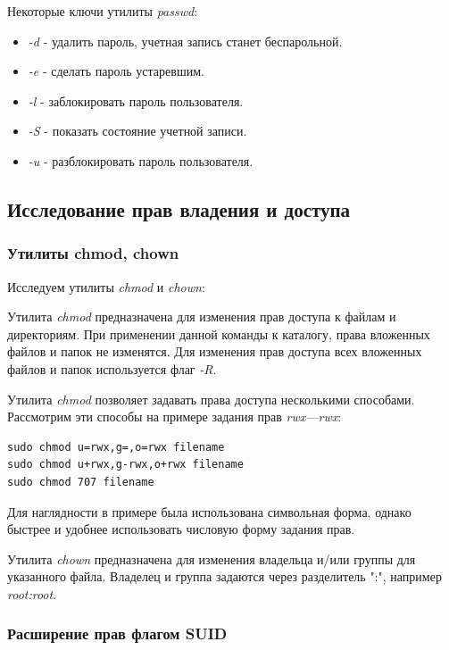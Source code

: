 \documentclass[14pt,a4paper,report]{report}
\begin{document}


Некоторые ключи утилиты \emph{passwd}:

\begin{itemize}
	\item \emph{-d} - удалить пароль, учетная запись станет беспарольной.
	\item \emph{-e} - сделать пароль устаревшим.
	\item \emph{-l} - заблокировать пароль пользователя.
	\item \emph{-S} - показать состояние учетной записи.
	\item \emph{-u} - разблокировать пароль пользователя.
\end{itemize}

\subsection{Исследование прав владения и доступа}

\subsubsection{Утилиты chmod, chown}

Исследуем утилиты \emph{chmod} и \emph{chown}:



Утилита \emph{chmod} предназначена для изменения прав доступа к файлам и директориям. При применении данной команды к каталогу, права вложенных файлов и папок не изменятся. Для изменения прав доступа всех вложенных файлов и папок используется флаг \emph{-R}. 

Утилита \emph{chmod} позволяет задавать права доступа несколькими способами. Рассмотрим эти способы на примере задания прав \emph{rwx---rwx}:

\begin{verbatim}
sudo chmod u=rwx,g=,o=rwx filename
sudo chmod u+rwx,g-rwx,o+rwx filename
sudo chmod 707 filename
\end{verbatim}

Для наглядности в примере была использована символьная форма, однако быстрее и удобнее использовать числовую форму задания прав.

Утилита \emph{chown} предназначена для изменения владельца и/или группы для указанного файла. Владелец и группа задаются через разделитель ":", например \emph{root:root}.

\subsubsection{Расширение прав флагом SUID}
\end{document}
